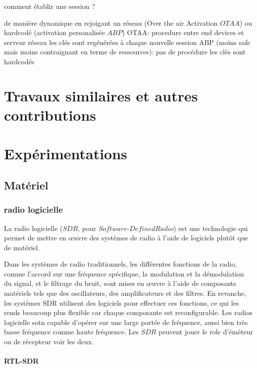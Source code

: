 \documentclass[12pt,a4paper,oneside, titlepage]{report}
\begin{document}
comment établir une session ?

de manière dynamique en rejoigant un réseau (Over the air Activation $OTAA$) ou hardcodé (activation personalisée $ABP$)
OTAA:
procedure entre end devices et serveur réseau
les clés sont regénérées à chaque nouvelle session
ABP (moins safe mais moins contraignant en terme de ressources):
pas de procédure
les clés sont hardcodés


\newpage

\chapter{Travaux similaires et autres contributions}


\newpage

\chapter{Expérimentations}

\section{Matériel}

\subsection{radio logicielle}

La radio logicielle ($SDR$, pour $Software$-$Defined Radio$) est une technologie qui permet de mettre en œuvre des systèmes de radio à l'aide de logiciels plutôt que de matériel. 

Dans les systèmes de radio traditionnels, les différentes fonctions de la radio, comme l'accord sur une fréquence spécifique, la modulation et la démodulation du signal, et le filtrage du bruit, sont mises en œuvre à l'aide de composants matériels tels que des oscillateurs, des amplificateurs et des filtres. En revanche, les systèmes SDR utilisent des logiciels pour effectuer ces fonctions, ce qui les rends beaucoup plus flexible car chaque composante est reconfigurable. Les radios logicielle sotn capable d'opérer sur une large portée de fréquence, aussi bien très basse fréquence comme haute fréquence.
Les $SDR$ peuvent jouer le role d'éméteur ou de récepteur voir les deux.

\subsubsection{RTL-SDR}
\end{document}
